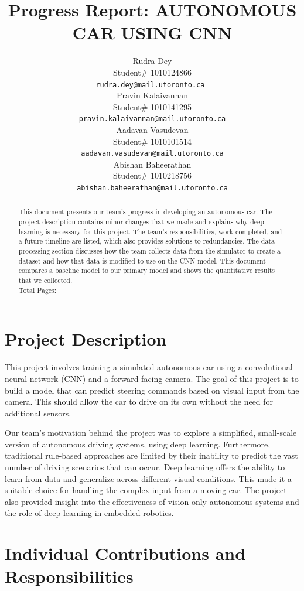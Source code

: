\documentclass{article} %
\title{Progress Report: AUTONOMOUS CAR USING CNN\\}
\author{Rudra Dey  \\
Student\# 1010124866\\
\texttt{rudra.dey@mail.utoronto.ca } \\
\And
Pravin Kalaivannan  \\
Student\# 1010141295 \\ 
\texttt{pravin.kalaivannan@mail.utoronto.ca} \\
\AND
Aadavan Vasudevan  \\
Student\# 1010101514 \\
\texttt{aadavan.vasudevan@mail.utoronto.ca} \\
\And
Abishan Baheerathan \\
Student\# 1010218756 \\
\texttt{abishan.baheerathan@mail.utoronto.ca} \\
\AND
}
\begin{document}
\maketitle

\begin{abstract}
This document presents our team’s progress in developing an autonomous car. The project description contains minor changes that we made and explains why deep learning is necessary for this project. The team’s responsibilities, work completed, and a future timeline are listed, which also provides solutions to redundancies. The data processing section discusses how the team collects data from the simulator to create a dataset and how that data is modified to use on the CNN model. This document compares a baseline model to our primary model and shows the quantitative results that we collected. 
\\
Total Pages: \pageref{last_page}
\end{abstract}

\section{Project Description}

This project involves training a simulated autonomous car using a convolutional neural network (CNN) and a forward-facing camera. The goal of this project is to build a model that can predict steering commands based on visual input from the camera. This should allow the car to drive on its own without the need for additional sensors.  

Our team’s motivation behind the project was to explore a simplified, small-scale version of autonomous driving systems, using deep learning. Furthermore, traditional rule-based approaches are limited by their inability to predict the vast number of driving scenarios that can occur. Deep learning offers the ability to learn from data and generalize across different visual conditions. This made it a suitable choice for handling the complex input from a moving car. The project also provided insight into the effectiveness of vision-only autonomous systems and the role of deep learning in embedded robotics.


\section{Individual Contributions and Responsibilities}
\end{document}
